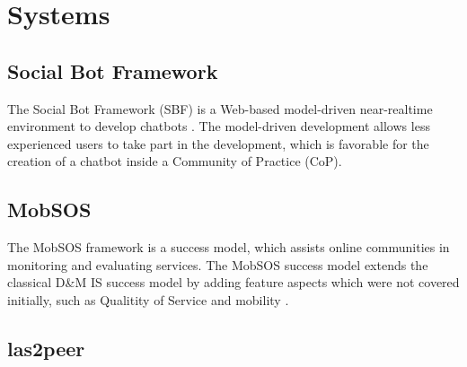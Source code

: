 \section{Systems} \label{lab:systems}

\subsection{Social Bot Framework}

The Social Bot Framework (SBF) is a Web-based model-driven near-realtime environment to develop chatbots \cite{NLKl19}. The model-driven development allows less experienced users to take part in the development, which is favorable for the creation of a chatbot inside a Community of Practice (CoP).

\subsection{MobSOS}
The MobSOS framework is a success model, which assists online communities in monitoring and evaluating services. The MobSOS success model extends the classical D\&M IS success model by adding feature aspects which were not covered initially, such as Qualitity of Service and mobility \cite{Renz08}.

\subsection{las2peer}
